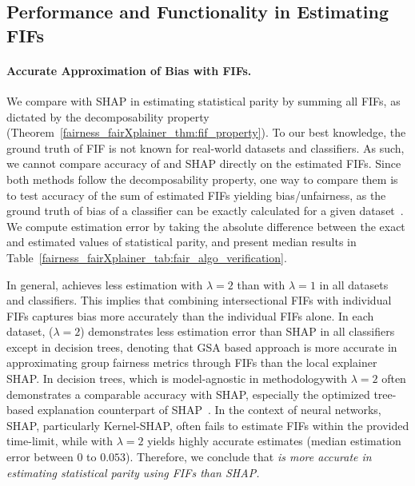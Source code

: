 

\subsection{Performance and Functionality in Estimating FIFs}
\paragraph{Accurate Approximation of Bias with FIFs.} We compare {\fairXplainer} with SHAP in estimating statistical parity by summing all FIFs, as dictated by the decomposability property (Theorem~\ref{fairness_fairXplainer_thm:fif_property}). {To our best knowledge, the ground truth of FIF is not known for real-world datasets and classifiers. As such, we cannot compare accuracy of {\fairXplainer} and SHAP directly on the estimated FIFs. Since both methods follow the decomposability property, one way to compare them is to test accuracy of the sum of estimated FIFs yielding bias/unfairness, as the ground truth of bias of a classifier can be exactly calculated for a given dataset~\cite{aif360-oct-2018}.}
We compute estimation error by taking the absolute difference between the exact and  estimated values of statistical parity, and present median results in Table~\ref{fairness_fairXplainer_tab:fair_algo_verification}. 

In general, {\fairXplainer} achieves less estimation with $ \lambda = 2 $ than with $ \lambda = 1 $ in all datasets and classifiers. This implies that combining intersectional FIFs with individual FIFs captures bias more accurately than the individual FIFs alone. In each dataset, {\fairXplainer} ($\lambda = 2$) demonstrates less estimation error than SHAP in all classifiers except in decision trees, denoting that GSA based approach {\fairXplainer} is more accurate in approximating group fairness metrics through FIFs than the local explainer SHAP. In decision trees, {\fairXplainer}\textemdash which is model-agnostic in methodology\textemdash with $ \lambda = 2 $ often demonstrates a comparable accuracy with SHAP, especially the optimized tree-based explanation counterpart of SHAP~\cite{lundberg2020local2global}. In the context of neural networks, SHAP, particularly Kernel-SHAP, often fails to estimate FIFs within the provided time-limit, while {\fairXplainer} with $ \lambda = 2 $ yields highly accurate estimates (median estimation error between $ 0$ to $0.053 $). Therefore, we conclude that \emph{{\fairXplainer} is more accurate in estimating statistical parity using FIFs than SHAP.}



